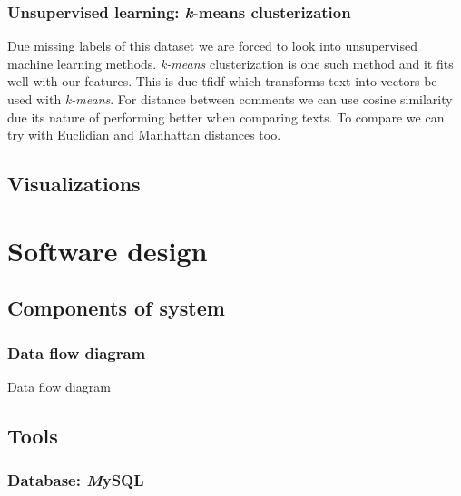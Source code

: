 \documentclass[a4paper,12pt]{article}
\begin{document}
	\subsubsection{Unsupervised learning: {\textit k-means} clusterization }
    
    Due missing labels of this dataset we are forced to look into unsupervised machine learning methods. \textit{k-means} clusterization \cite{clusterization} is one such method and it fits well with our features. This is due \acrshort{tfidf} which transforms text into vectors be used with \textit{k-means}.
    For distance between comments we can use cosine similarity \cite{cosine_similarity} due its nature of performing better when comparing texts. To compare we can try with Euclidian and Manhattan distances too.
    \subsection{Visualizations}

    
    \clearpage
    
    \section{Software design}
    \subsection{Components of system}
  	\subsubsection{Data flow diagram}
		Data flow diagram
		
  	\subsection{Tools}
    
    
    \subsubsection{Database: {\textit MySQL}}
\end{document}
